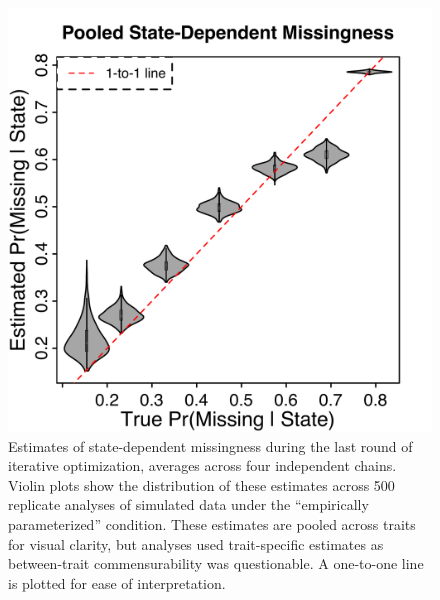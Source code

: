 \documentclass[10pt, twocolumn, twoside]{article}
\begin{document}
\begin{figure}[h]
\centering
\includegraphics[width=160mm]{figures/chpt4_figure7.pdf}
\caption[Violin Plots of Estimated State-Dependent Missing Probabilities]{Estimates of state-dependent missingness during the last round of iterative optimization, averages across four independent chains. Violin plots show the distribution of these estimates across 500 replicate analyses of simulated data under the ``empirically parameterized'' condition. These estimates are pooled across traits for visual clarity, but analyses used trait-specific estimates as between-trait commensurability was questionable. A one-to-one line is plotted for ease of interpretation. \label{overflow}
\label{fig:simsMissingProbs}
}
\end{figure}
\end{document}
